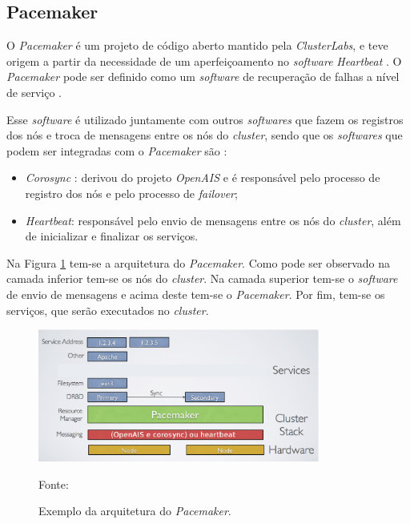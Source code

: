 
\subsection{Pacemaker}
\label{section:pacemaker}
O \textit{Pacemaker} \cite{pacemaker} é um projeto de código aberto mantido pela \textit{ClusterLabs}, e teve origem a partir da necessidade 
de um aperfeiçoamento no \textit{software} \textit{Heartbeat} \cite{heartbeat}. 
O \textit{Pacemaker} pode ser definido como um \textit{software} de recuperação de falhas a nível de serviço \cite{perkov2011}. 

Esse \textit{software} é utilizado juntamente com outros \textit{softwares} que fazem os registros dos nós e troca de mensagens entre os nós do 
\textit{cluster}, sendo que os \textit{softwares} que podem ser integradas com o \textit{Pacemaker} são \cite{pacemaker}:
\begin{itemize}
 \item \textit{Corosync} \cite{corosync}: derivou do projeto \textit{OpenAIS} e é responsável pelo processo de registro dos nós e pelo processo 
 de \textit{failover};
 \item \textit{Heartbeat}: responsável pelo envio de mensagens entre os nós do \textit{cluster}, além de inicializar e finalizar os serviços.
\end{itemize}


Na Figura \ref{fig:pacemaker_tools} tem-se a arquitetura do \textit{Pacemaker}. Como pode ser observado na camada inferior tem-se os nós do 
\textit{cluster}. Na camada superior tem-se o \textit{software} de envio de mensagens e acima deste tem-se o \textit{Pacemaker}. 
Por fim, tem-se os serviços, que serão executados no \textit{cluster}.

\begin{figure}[h!]
 \centering
 \includegraphics[width=350px]{img/pacemaker_tools.eps}
 \caption{Exemplo da arquitetura do \textit{Pacemaker}.}
 Fonte: \citet{pacemaker}
 \label{fig:pacemaker_tools}
\end{figure}

